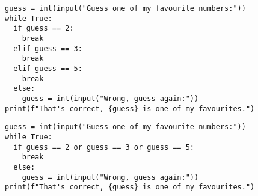\begin{frame}[fragile]
  \begin{example}
    \begin{verbatim}
guess = int(input("Guess one of my favourite numbers:"))
while True:
  if guess == 2:
    break
  elif guess == 3:
    break
  elif guess == 5:
    break
  else:
    guess = int(input("Wrong, guess again:"))
print(f"That's correct, {guess} is one of my favourites.")
    \end{verbatim}
  \end{example}
\end{frame}

\begin{frame}[fragile]
  \begin{example}
    \begin{verbatim}
guess = int(input("Guess one of my favourite numbers:"))
while True:
  if guess == 2 or guess == 3 or guess == 5:
    break
  else:
    guess = int(input("Wrong, guess again:"))
print(f"That's correct, {guess} is one of my favourites.")
    \end{verbatim}
  \end{example}
\end{frame}


